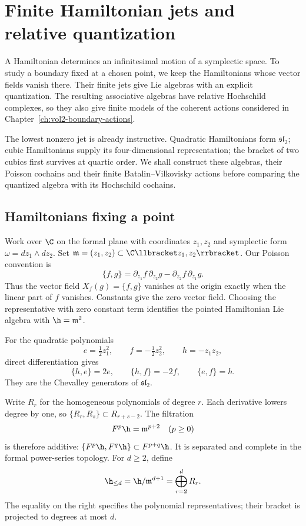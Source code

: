 \chapter{Finite Hamiltonian jets and relative quantization}
\label{ch:vol2-hamiltonian-jets}

A Hamiltonian determines an infinitesimal motion of a symplectic space.
To study a boundary fixed at a chosen point, we keep the Hamiltonians
whose vector fields vanish there. Their finite jets give Lie algebras
with an explicit quantization. The resulting associative algebras have
relative Hochschild complexes, so they also give finite models of the
coherent actions considered in Chapter~\ref{ch:vol2-boundary-actions}.

The lowest nonzero jet is already instructive. Quadratic Hamiltonians form
$\mathfrak{sl}_2$; cubic Hamiltonians supply its four-dimensional
representation; the bracket of two cubics first survives at quartic
order. We shall construct these algebras, their Poisson cochains and
their finite Batalin--Vilkovisky actions before comparing the
quantized algebra with its Hochschild cochains.

\section{Hamiltonians fixing a point}

Work over $\C$ on the formal plane with coordinates $z_1,z_2$ and
symplectic form $\omega=dz_1\wedge dz_2$. Set
$\mathfrak m=(z_1,z_2)\subset\C\llbracket z_1,z_2\rrbracket$.
Our Poisson convention is
\begin{equation}\label{eq:vol2-hamiltonian-bracket}
 \{f,g\}=\partial_{z_1}f\,\partial_{z_2}g
             -\partial_{z_2}f\,\partial_{z_1}g.
\end{equation}
Thus the vector field $X_f(g)=\{f,g\}$ vanishes at the origin
exactly when the linear part of $f$ vanishes. Constants give the zero
vector field. Choosing the representative with zero constant term
identifies the pointed Hamiltonian Lie algebra with
$\h=\mathfrak m^2$.

For the quadratic polynomials
\[
 e=\tfrac12z_1^2,\qquad f=-\tfrac12z_2^2,\qquad h=-z_1z_2,
\]
direct differentiation gives
\begin{equation}\label{eq:vol2-quadratic-brackets}
 \{h,e\}=2e,\qquad \{h,f\}=-2f,\qquad \{e,f\}=h.
\end{equation}
They are the Chevalley generators of $\mathfrak{sl}_2$.

Write $R_r$ for the homogeneous polynomials of degree $r$.
Each derivative lowers degree by one, so
$\{R_r,R_s\}\subset R_{r+s-2}$.
The filtration
\[
 F^p\h=\mathfrak m^{p+2}\quad(p\geq0)
\]
is therefore additive:
$\{F^p\h,F^q\h\}\subset F^{p+q}\h$.
It is separated and complete in the formal power-series topology.
For $d\geq2$, define
\begin{equation}\label{eq:vol2-finite-jet}
 \h_{\leq d}=\h/\mathfrak m^{d+1}
             =\bigoplus_{r=2}^{d}R_r.
\end{equation}
The equality on the right specifies the polynomial representatives;
their bracket is projected to degrees at most $d$.

